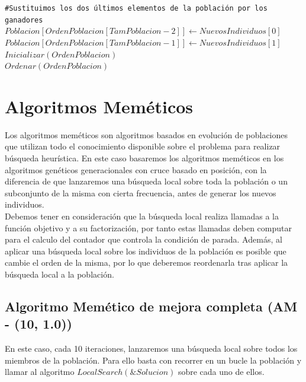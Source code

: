 \documentclass[11pt,a4paper]{article}
\begin{document}
\begin{algorithm} [!h]
{{					\texttt{\#Sustituimos los dos últimos elementos de la población por los ganadores}\\
					$Poblacion[OrdenPoblacion[TamPoblacion-2]] \leftarrow NuevosIndividuos[0]$\\
					$Poblacion[OrdenPoblacion[TamPoblacion-1]] \leftarrow NuevosIndividuos[1]$\\
					
					$Inicializar(OrdenPoblacion)$\\
					$Ordenar(OrdenPoblacion)$\\
					
				}
				
				
			}
			
		\end{algorithm}
		

\section{Algoritmos Meméticos}

	\noindent Los algoritmos meméticos son algoritmos basados en evolución de poblaciones que utilizan todo el conocimiento disponible sobre el problema para realizar búsqueda heurística. En este caso basaremos los algoritmos meméticos en los algoritmos genéticos generacionales con cruce basado en posición, con la diferencia de que lanzaremos una búsqueda local sobre toda la población o un subconjunto de la misma con cierta frecuencia, antes de generar los nuevos individuos.\\
	
	\noindent Debemos tener en consideración que la búsqueda local realiza llamadas a la función objetivo y a su factorización, por tanto estas llamadas deben computar para el calculo del contador que controla la condición de parada. Además, al aplicar una búsqueda local sobre los individuos de la población es posible que cambie el orden de la misma, por lo que deberemos reordenarla tras aplicar la búsqueda local a la población.
	
	\subsection{Algoritmo Memético de mejora completa (AM - (10, 1.0))}
	
		\noindent En este caso, cada 10 iteraciones, lanzaremos una búsqueda local sobre todos los miembros de la población. Para ello basta con recorrer en un bucle la población y llamar al algoritmo $LocalSearch(\&Solucion)$ sobre cada uno de ellos.\\
		
\end{document}
